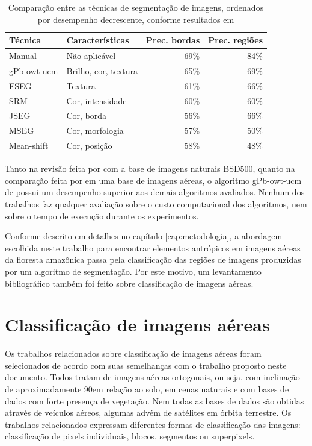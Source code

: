 \begin{table}[h]
\centering
\begin{tabulary}{\linewidth}{|L|L|R|R|}
\hline
\textbf{Técnica} & \textbf{Características} & \textbf{Prec. bordas} & \textbf{Prec. regiões } \\ \hline
Manual      & Não aplicável        & 69\% & 84\% \\ \hline
gPb-owt-ucm & Brilho, cor, textura & 65\% & 69\% \\ \hline
FSEG        & Textura              & 61\% & 66\% \\ \hline
SRM         & Cor, intensidade     & 60\% & 60\% \\ \hline
JSEG        & Cor, borda           & 56\% & 66\% \\ \hline
MSEG        & Cor, morfologia      & 57\% & 50\% \\ \hline
Mean-shift  & Cor, posição         & 58\% & 48\% \\ \hline
\end{tabulary}
\caption{Comparação entre as técnicas de segmentação de imagens, ordenados por desempenho decrescente, conforme resultados em  }
\label{tab:sumarioSegmentacao}
\end{table}

Tanto na revisão feita por  com a base de imagens naturais BSD500, quanto na comparação feita por  em uma base de imagens aéreas, o algoritmo gPb-owt-ucm de  possui um desempenho superior aos demais algoritmos avaliados. Nenhum dos trabalhos faz qualquer avaliação sobre o custo computacional dos algoritmos, nem sobre o tempo de execução durante os experimentos.

Conforme descrito em detalhes no capítulo \ref{cap:metodologia}, a abordagem escolhida neste trabalho para encontrar elementos antrópicos em imagens aéreas da floresta amazônica passa pela classificação das regiões de imagens produzidas por um algoritmo de segmentação. Por este motivo, um levantamento bibliográfico também foi feito sobre classificação de imagens aéreas.

\section{Classificação de imagens aéreas}\label{sec:trClassificacao}

Os trabalhos relacionados sobre classificação de imagens aéreas foram selecionados de acordo com suas semelhanças com o trabalho proposto neste documento. Todos tratam de imagens aéreas ortogonais, ou seja, com inclinação de aproximadamente 90\degree em relação ao solo, em cenas naturais e com bases de dados com forte presença de vegetação. Nem todas as bases de dados são obtidas através de veículos aéreos, algumas advém de satélites em órbita terrestre. Os trabalhos relacionados expressam diferentes formas de classificação das imagens: classificação de pixels individuais, blocos, segmentos ou superpixels.

